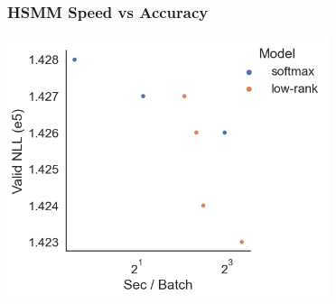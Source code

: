 \documentclass{beamer}
\begin{document}
\begin{frame}
\frametitle{HSMM Speed vs Accuracy}
\centering
\includegraphics[height=3in]{imgs/hmm/hsmm-speed-accuracy.png}
\end{frame}
\end{document}
